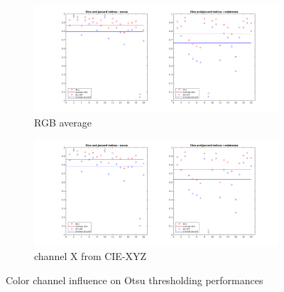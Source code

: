 \documentclass[a4paper,10pt]{article}
\begin{document}
\begin{figure}
\begin{subfigure}{0.7\textwidth}
    \includegraphics[width=0.9\linewidth]{../results/color-channel-influence/base-evaluation/otsu-dice-jaccard-meanRGB.png}
    \caption{RGB average}
    \label{fig:otsu-mean}
  \end{subfigure}
  \begin{subfigure}{0.7\textwidth}
    \includegraphics[width=0.9\linewidth]{../results/color-channel-influence/base-evaluation/otsu-dice-jaccard-X.png}
    \caption{channel X from CIE-XYZ}
    \label{fig:otsu-X}
  \end{subfigure}

  \caption{Color channel influence on Otsu thresholding performances}
  \label{fig:color-channel-otsu}
\end{figure} 




\end{document}

